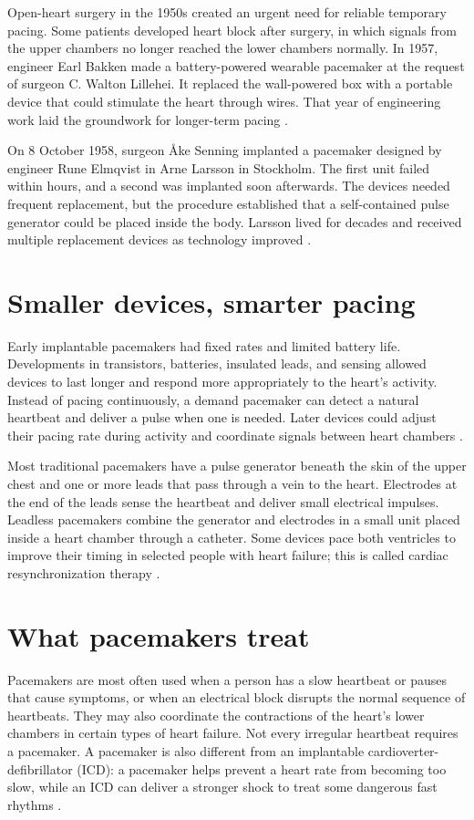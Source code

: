 \documentclass[12pt,oneside]{book}
\begin{document}
Open-heart surgery in the 1950s created an urgent need for reliable
temporary pacing. Some patients developed heart block after surgery, in
which signals from the upper chambers no longer reached the lower chambers
normally. In 1957, engineer Earl Bakken made a battery-powered wearable
pacemaker at the request of surgeon C. Walton Lillehei. It replaced the
wall-powered box with a portable device that could stimulate the heart
through wires. That year of engineering work laid the groundwork for
longer-term pacing \cite{aquilinaPacingHistory}.

On 8 October 1958, surgeon Åke Senning implanted a pacemaker designed by
engineer Rune Elmqvist in Arne Larsson in Stockholm. The first unit failed
within hours, and a second was implanted soon afterwards. The devices
needed frequent replacement, but the procedure established that a
self-contained pulse generator could be placed inside the body. Larsson
lived for decades and received multiple replacement devices as technology
improved \cite{aquilinaPacingHistory}.

\section{Smaller devices, smarter pacing}
Early implantable pacemakers had fixed rates and limited battery life.
Developments in transistors, batteries, insulated leads, and sensing
allowed devices to last longer and respond more appropriately to the
heart's activity. Instead of pacing continuously, a demand pacemaker can
detect a natural heartbeat and deliver a pulse when one is needed. Later
devices could adjust their pacing rate during activity and coordinate
signals between heart chambers \cite{aquilinaPacingHistory}.

Most traditional pacemakers have a pulse generator beneath the skin of the
upper chest and one or more leads that pass through a vein to the heart.
Electrodes at the end of the leads sense the heartbeat and deliver small
electrical impulses. Leadless pacemakers combine the generator and
electrodes in a small unit placed inside a heart chamber through a catheter.
Some devices pace both ventricles to improve their timing in selected
people with heart failure; this is called cardiac resynchronization
therapy \cite{nhlbiPacemakerHowItWorks}.

\section{What pacemakers treat}
Pacemakers are most often used when a person has a slow heartbeat or
pauses that cause symptoms, or when an electrical block disrupts the
normal sequence of heartbeats. They may also coordinate the contractions
of the heart's lower chambers in certain types of heart failure. Not every
irregular heartbeat requires a pacemaker. A pacemaker is also different
from an implantable cardioverter-defibrillator (ICD): a pacemaker helps
prevent a heart rate from becoming too slow, while an ICD can deliver a
stronger shock to treat some dangerous fast rhythms
\cite{nhlbiPacemakerNeeds,nhlbiPacemakerHowItWorks}.
\end{document}
